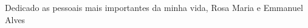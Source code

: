 
\chapter*{}
\vspace{15cm}
\begin{flushright}
	Dedicado as pessoais mais importantes da minha vida, Rosa Maria e Emmanuel Alves
\end{flushright}